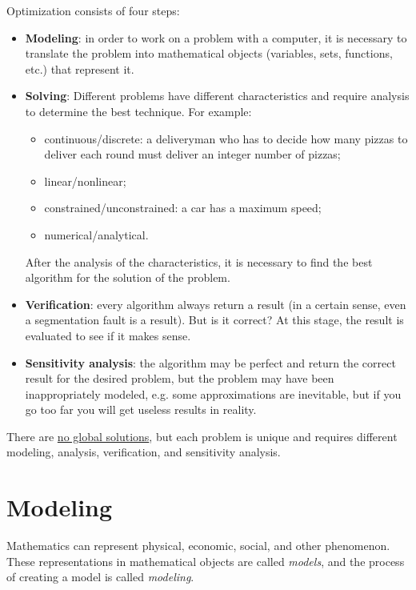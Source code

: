 Optimization consists of four steps:
\begin{itemize}
    \item \textbf{Modeling}: in order to work on a problem with a computer, it is necessary to translate the problem into mathematical objects (variables, sets, functions, etc.) that represent it.
    
    \item \textbf{Solving}: Different problems have different characteristics and require analysis to determine the best technique. For example: 
    \begin{itemize}
        \item continuous/discrete: a deliveryman who has to decide how many pizzas to deliver each round must deliver an integer number of pizzas;
        \item linear/nonlinear;
        \item constrained/unconstrained: a car has a maximum speed;
        \item numerical/analytical. 
    \end{itemize}
    After the analysis of the characteristics, it is necessary to find the best algorithm for the solution of the problem.

    \item \textbf{Verification}: every algorithm always return a result (in a certain sense, even a segmentation fault is a result). But is it correct? At this stage, the result is evaluated to see if it makes sense.
    
    \item \textbf{Sensitivity analysis}: the algorithm may be perfect and return the correct result for the desired problem, but the problem may have been inappropriately modeled, e.g. some approximations are inevitable, but if you go too far you will get useless results in reality.
\end{itemize}

There are \underline{no global solutions}, but each problem is unique and requires different modeling, analysis, verification, and sensitivity analysis.



\section{Modeling}
\label{sec:op.modeling}

Mathematics can represent physical, economic, social, and other phenomenon. These representations in mathematical objects are called \textit{models}, and the process of creating a model is called \textit{modeling}.

